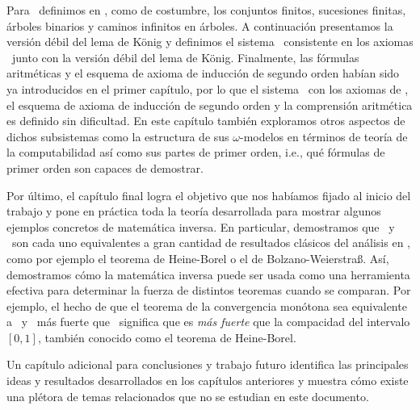 \documentclass[../main.tex]{memoir}
\begin{document}
Para \wkl\ definimos en \rca, como de costumbre, los conjuntos finitos, sucesiones finitas, árboles binarios y caminos infinitos en árboles. A continuación presentamos la versión débil del lema de König y definimos el sistema \wkl\ consistente en los axiomas \rca\ junto con la versión débil del lema de König. Finalmente, las fórmulas aritméticas y el esquema de axioma de inducción de segundo orden habían sido ya introducidos en el primer capítulo, por lo que el sistema \aca\ con los axiomas de \rca, el esquema de axioma de inducción de segundo orden y la comprensión aritmética es definido sin dificultad. En este capítulo también exploramos otros aspectos de dichos subsistemas como la estructura de sus $\omega$-modelos en términos de teoría de la computabilidad así como sus partes de primer orden, i.e., qué fórmulas de primer orden son capaces de demostrar.

Por último, el capítulo final logra el objetivo que nos habíamos fijado al inicio del trabajo y pone en práctica toda la teoría desarrollada para mostrar algunos ejemplos concretos de matemática inversa. En particular, demostramos que \wkl\ y \aca\ son cada uno equivalentes a gran cantidad de resultados clásicos del análisis en \rca, como por ejemplo el teorema de Heine-Borel o el de Bolzano-Weierstra{\ss}. Así, demostramos cómo la matemática inversa puede ser usada como una herramienta efectiva para determinar la fuerza de distintos teoremas cuando se comparan. Por ejemplo, el hecho de que el teorema de la convergencia monótona sea equivalente a \aca\ y \aca\ más fuerte que \wkl\ significa que es \textit{más fuerte} que la compacidad del intervalo $[0, 1]$, también conocido como el teorema de Heine-Borel.

Un capítulo adicional para conclusiones y trabajo futuro identifica las principales ideas y resultados desarrollados en los capítulos anteriores y muestra cómo existe una plétora de temas relacionados que no se estudian en este documento.

\newpage
\end{document}
